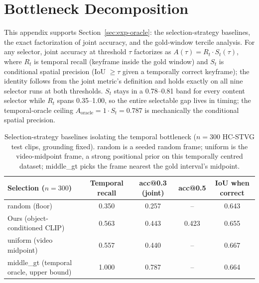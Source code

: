 \section{Bottleneck Decomposition}\label{app:decomp}

This appendix supports Section~\ref{sec:exp-oracle}: the selection-strategy baselines, the exact factorization of joint accuracy, and the gold-window tercile analysis. For any selector, joint accuracy at threshold $\tau$ factorizes as $A(\tau) = R_t \cdot S_t(\tau)$, where $R_t$ is temporal recall (keyframe inside the gold window) and $S_t$ is conditional spatial precision (IoU $\ge \tau$ given a temporally correct keyframe); the identity follows from the joint metric's definition and holds exactly on all nine selector runs at both thresholds. $S_t$ stays in a 0.78--0.81 band for every content selector while $R_t$ spans 0.35--1.00, so the entire selectable gap lives in timing; the temporal-oracle ceiling $A_{\mathrm{oracle}} = 1 \cdot S_t = 0.787$ is mechanically the conditional spatial precision.

\begin{table}[htbp]
\centering
\small
\begin{tabular}{lcccc}
\toprule
Selection ($n=300$) & Temporal recall & acc@0.3 (joint) & acc@0.5 & IoU when correct \\
\midrule
random (floor) & 0.350 & 0.257 & -- & 0.643 \\
Ours (object-conditioned CLIP) & 0.563 & 0.443 & 0.423 & 0.655 \\
uniform (video midpoint) & 0.557 & 0.440 & -- & 0.667 \\
middle\_gt (temporal oracle, upper bound) & 1.000 & 0.787 & -- & 0.664 \\
\bottomrule
\end{tabular}
\caption{Selection-strategy baselines isolating the temporal bottleneck ($n=300$ HC-STVG test clips, grounding fixed). random is a seeded random frame; uniform is the video-midpoint frame, a strong positional prior on this temporally centred dataset; middle\_gt picks the frame nearest the gold interval's midpoint.}
\label{tab:selbase}
\end{table}

